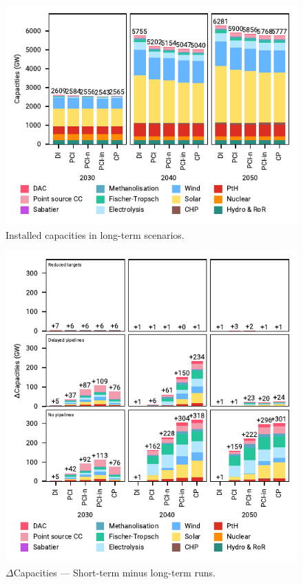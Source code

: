 \documentclass[pdflatex,sn-nature]{sn-jnl}
\theoremstyle{thmstyleone}%
\theoremstyle{thmstyletwo}%
\theoremstyle{thmstylethree}%
\begin{document}
\begin{appendices}
\begin{figure}[htbp]
  \centering
  \includegraphics{figures/capacities_overview}
  \caption{Installed capacities in long-term scenarios.}
  \label{fig:capacities_overview}
\end{figure}

\begin{figure}[htbp]
  \centering
  \includegraphics{figures/capacities_overview_extended}
  \caption{$\Delta$Capacities --- Short-term minus long-term runs.}
  \label{fig:capacities_overview_extended}
\end{figure}


\end{appendices}
\end{document}
